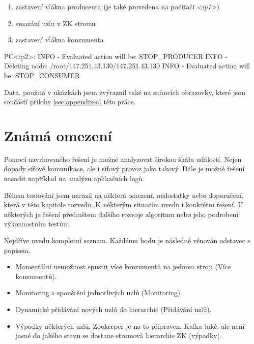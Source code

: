 \documentclass[
  digital, %
  table,   %
  nolof,     %
  nolot,     %
  oneside, %
  nocover,
  monochrome,
  12pt
]{fithesis3}
\begin{document}
\begin{enumerate}
  \item zastavení vlákna producenta (je také provedena na počítači \textit{<ip1>})
  \item smazání uzlu v ZK stromu
  \item zastavení vlákna konzumenta
\end{enumerate}

\begin{center}
\begin{minipage}[H]{\linewidth}
	\begin{mylisting}
PC<ip2>:
INFO - Evaluated action will be: STOP_PRODUCER
INFO - Deleting node: /root/147.251.43.130/147.251.43.130
INFO - Evaluated action will be: STOP_CONSUMER
	\end{mylisting}
	\label{fig:clean-up-example}
\end{minipage}
\end{center}

Data, použitá v ukázkách jsem zvýraznil také na snímcích obrazovky, které jsou součástí přílohy \ref{sec:appendix-a} této práce.


\section{Známá omezení}
Pomocí navrhovaného řešení je možné analyzovat širokou škálu událostí. Nejen dopady síťové komunikace, ale i síťový provoz jako takový. Dále je možné řešení nasadit například na analýzu aplikačních logů.

Během testování jsem narazil na některá omezení, nedostatky nebo doporučení, která v této kapitole rozvedu. K některým situacím uvedu i konkrétní řešení. U některých je řešení předmětem dalšího rozvoje algoritmu nebo jeho podrobení výkonnostním testům.

Nejdříve uvedu kompletní seznam. Každému bodu je následně věnován odstavec s popisem.

\begin{itemize}
	\item Momentální nemožnost spustit více konzumentů na jednom stroji (Více konzumentů).
	\item Monitoring a spouštění jednotlivých uzlů (Monitoring).
	\item Dynamické přidávání nových uzlů do hierarchie (Přidávání uzlů).
	\item Výpadky některých uzlů. Zookeeper je na to připraven, Kafka také, ale není jasné do jakého stavu se dostane stromová hierarchie ZK (výpadky).
\end{itemize}
\end{document}
